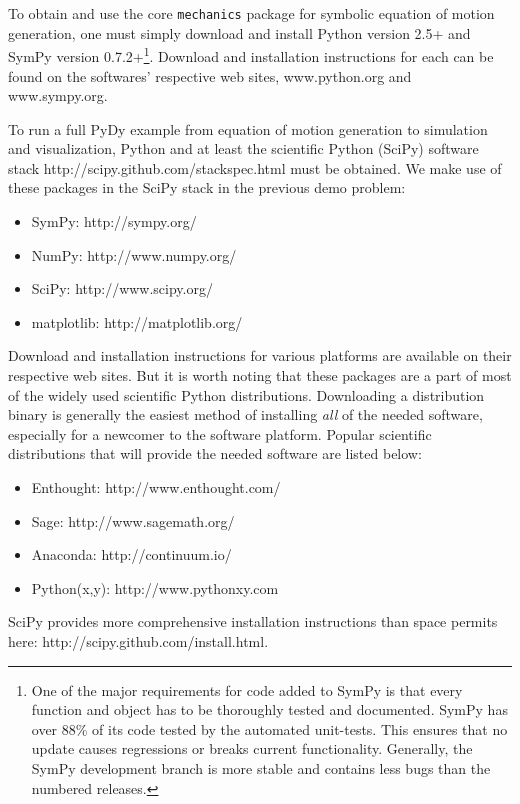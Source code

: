 \documentclass[twocolumn,10pt]{asme2e}
\begin{document}
To obtain and use the core \verb|mechanics| package for symbolic equation of
motion generation, one must simply download and install Python version 2.5+ and
SymPy version 0.7.2+\footnote{One of the major requirements for code added to
SymPy is that every function and object has to be thoroughly tested and
documented. SymPy has over 88\% of its code tested by the automated unit-tests.
This ensures that no update causes regressions or breaks current functionality.
Generally, the SymPy development branch is more stable and contains less bugs
than the numbered releases.}. Download and installation instructions for each
can be found on the softwares' respective web sites, www.python.org and
www.sympy.org.

To run a full PyDy example from equation of motion generation to simulation and
visualization, Python and at least the scientific Python (SciPy) software stack
http://scipy.github.com/stackspec.html must be obtained. We make use of these
packages in the SciPy stack in the previous demo problem:
%
\begin{itemize}
  \item SymPy: http://sympy.org/
  \item NumPy: http://www.numpy.org/
  \item SciPy: http://www.scipy.org/
  \item matplotlib: http://matplotlib.org/
\end{itemize}
%
Download and installation instructions for various platforms are available on
their respective web sites. But it is worth noting that these packages are a
part of most of the widely used scientific Python distributions. Downloading a
distribution binary is generally the easiest method of installing \emph{all} of
the needed software, especially for a newcomer to the software platform.
Popular scientific distributions that will provide the needed software are
listed below:
%
\begin{itemize}
  \item Enthought: http://www.enthought.com/
  \item Sage: http://www.sagemath.org/
  \item Anaconda: http://continuum.io/
  \item Python(x,y): http://www.pythonxy.com
\end{itemize}
%
SciPy provides more comprehensive installation instructions than space permits
here: http://scipy.github.com/install.html.
\end{document}
